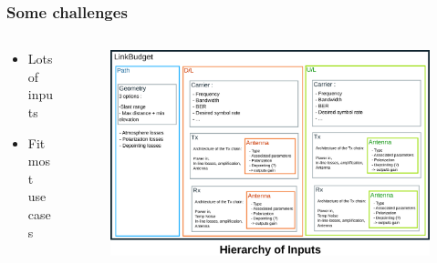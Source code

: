 \documentclass[11pt]{beamer}
\begin{document}
\begin{frame}
	\frametitle{Some challenges}
	\begin{columns}[onlytextwidth]
		\begin{column}{0.45\textwidth}
			\begin{itemize}
				\item Lots of inputs
				\item Fit most use cases
			\end{itemize}
		\end{column}
		
		\begin{column}{0.6\textwidth}
			\begin{figure}
				\includegraphics[width=\textwidth]{hierarchSimplified.png}
			\end{figure}
		\end{column}
		
		\hfill
	\end{columns}
\end{frame}
\end{document}
